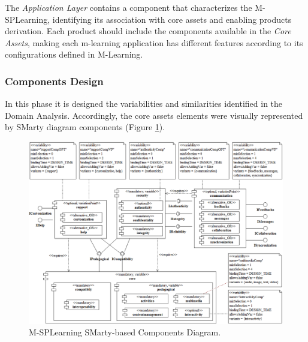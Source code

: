 The \textit{Application Layer} contains a component that characterizes the M-SPLear\allowbreak ning, identifying its association with core assets and enabling products derivation. Each product should include the components available in the \textit{Core Assets}, making each m-learning application has different features according to its configurations defined in M-Learning.

\subsubsection{Components Design}

In this phase it is designed the variabilities and similarities identified in the Domain Analysis. Accordingly, the core assets elements were visually represented by SMarty diagram components (Figure \ref{figureMSPLDesign}).

\begin{figure}
\centering
\includegraphics[scale=0.445]{figures/section3/MSPLDesign}
\caption{M-SPLear\allowbreak ning SMarty-based Components Diagram.}
\label{figureMSPLDesign}
\end{figure}

